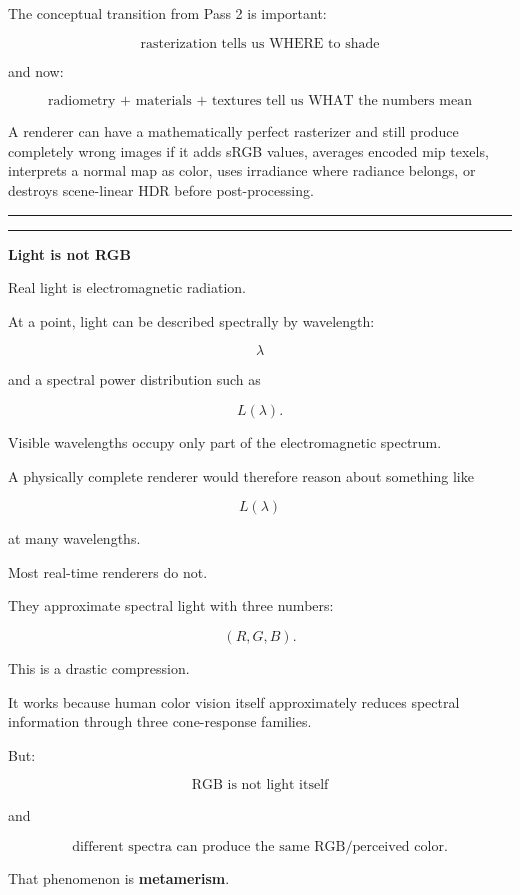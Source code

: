 The conceptual transition from Pass 2 is important:

\[
\text{rasterization tells us WHERE to shade}
\]

and now:

\[
\boxed{\text{radiometry + materials + textures tell us WHAT the numbers mean}}
\]

A renderer can have a mathematically perfect rasterizer and still produce completely wrong images if it adds sRGB values, averages encoded mip texels, interprets a normal map as color, uses irradiance where radiance belongs, or destroys scene-linear HDR before post-processing.

\begin{center}\rule{0.5\linewidth}{0.5pt}\end{center}

\begin{center}\rule{0.5\linewidth}{0.5pt}\end{center}

\textbf{Light is not RGB}

Real light is electromagnetic radiation.

At a point, light can be described spectrally by wavelength:

\[
\lambda
\]

and a spectral power distribution such as

\[
L(\lambda).
\]

Visible wavelengths occupy only part of the electromagnetic spectrum.

A physically complete renderer would therefore reason about something like

\[
L(\lambda)
\]

at many wavelengths.

Most real-time renderers do not.

They approximate spectral light with three numbers:

\[
(R,G,B).
\]

This is a drastic compression.

It works because human color vision itself approximately reduces spectral information through three cone-response families.

But:

\[
\boxed{\text{RGB is not light itself}}
\]

and

\[
\boxed{\text{different spectra can produce the same RGB/perceived color}}.
\]

That phenomenon is \textbf{metamerism}.

